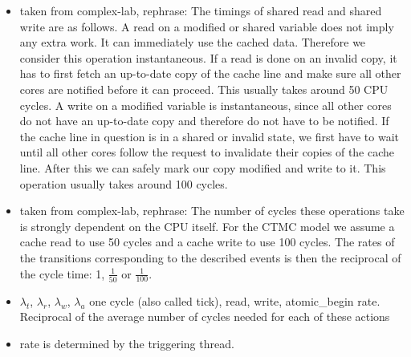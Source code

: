\documentclass[a4paper, 10pt]{article}
\begin{document}
\begin{enumerate}
\begin{itemize}
	\item taken from complex-lab, rephrase: The timings of shared read and shared write are as follows. A read on a modified or shared variable does not imply any extra work. It can immediately use the cached data. Therefore we consider this operation instantaneous. If a read is done on an invalid copy, it has to first fetch an up-to-date copy of the cache line and make sure all other cores are notified before it can proceed. This usually takes around 50 CPU cycles. A write on a modified variable is instantaneous, since all other cores do not have an up-to-date copy and therefore do not have to be notified. If the cache line in question is in a shared or invalid state, we first have to wait until all other cores follow the request to invalidate their copies of the cache line. After this we can safely mark our copy modified and write to it. This operation usually takes around 100 cycles.
	\item taken from complex-lab, rephrase: The number of cycles these operations take is strongly dependent on the CPU itself. For the CTMC model we assume a cache read to use 50 cycles and a cache write to use 100 cycles. The rates of the transitions corresponding to the described events is then the reciprocal of the cycle time: 1, $\frac{1}{50}$ or $\frac{1}{100}$.
	\item $\lambda_t$, $\lambda_r$, $\lambda_w$, $\lambda_a$ one cycle (also called tick), read, write, atomic\_begin rate. Reciprocal of the average number of cycles needed for each of these actions
	\item rate is determined by the triggering thread.
\end{itemize}


\end{enumerate}
\end{document}
